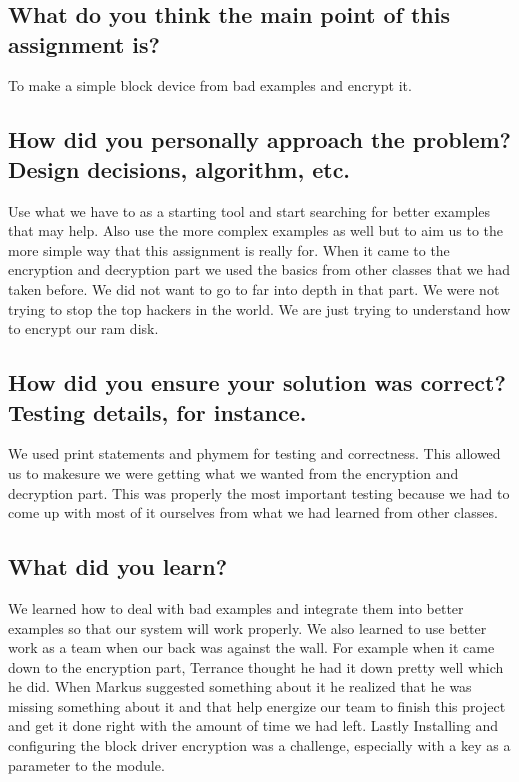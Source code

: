 \documentclass[draftclsnofoot,onecolumn,10pt,compsoc]{IEEEtran}
\begin{document}
\section{}
\subsection{What do you think the main point of this assignment is?}
To make a simple block device from bad examples and encrypt it.  
\subsection{How did you personally approach the problem? Design decisions, algorithm, etc.}
Use what we have to as a starting tool and start searching for better examples that may help. Also use the more complex examples as well but to aim us to the more simple way that this assignment is really for.  When it came to the encryption and decryption part we used the basics from other classes that we had taken before.  We did not want to go to far into depth in that part.  We were not trying to stop the top hackers in the world.  We are just trying to understand how to encrypt our ram disk.    
\subsection{How did you ensure your solution was correct? Testing details, for instance.}
We used print statements and phymem for testing and correctness.  This allowed us to makesure we were getting what we wanted from the encryption and decryption part.  This was properly the most important testing because we had to come up with most of it ourselves from what we had learned from other classes. 
\subsection{What did you learn?}
We learned how to deal with bad examples and integrate them into better examples so that our system will work properly.  We also learned to use better work as a team when our back was against the wall.  For example when it came down to the encryption part, Terrance thought he had it down pretty well which he did.  When Markus suggested something about it he realized that he was missing something about it and that help energize our team to finish this project and get it done right with the amount of time we had left. Lastly Installing and configuring the block driver encryption was a challenge, especially with a key as a parameter to the module.
\end{document}
